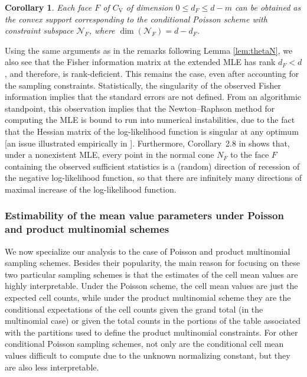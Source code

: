 \documentclass[aos,MSNbibl,nameyear,dvips]{arximspdf}
\newtheorem{corollary}[theorem]{Corollary}
\newcommand{\m}[1]{\mathrm{#1}}
\begin{document}
\begin{corollary}\label{cor:struct}
Each face $F$ of $C_{\m{V}}$ of dimension $0 \leq d_F \leq d - m$ can
be obtained as the convex support corresponding to the conditional
Poisson scheme with constraint subspace $\mathcal{N}_{F}$, where
$\operatorname{dim}(\mathcal{N}_{F}) = d - d_F$.
\end{corollary}

Using the same arguments as in the remarks following Lemma
\ref{lem:thetaN}, we also see that the Fisher information matrix at the
extended MLE has rank $d_F < d$, and therefore, is rank-deficient. This
remains the case, even after accounting for\vadjust{\goodbreak} the sampling constraints.
Statistically, the singularity of the observed Fisher information
implies that the standard errors are not defined. From an algorithmic
standpoint, this observation implies that the Newton--Raphson method
for computing the MLE is bound to run into numerical instabilities, due
to the fact that the Hessian matrix of the log-likelihood function is
singular at any optimum [an issue illustrated empirically in
\citet{ROY05}]. Furthermore, Corollary~2.8 in \citet{ERGM09} shows
that, under a nonexistent MLE, every point in the normal cone $N_F$ to
the face $F$ containing the observed sufficient statistics is a
(random) direction of recession of the negative log-likelihood
function, so that there are infinitely many directions of maximal
increase of the log-likelihood function.


\subsubsection{Estimability of the mean value parameters under Poisson
and product multinomial schemes}\label{sec:mean.value}

We now specialize our analysis to the case of Poisson and product
multinomial sampling schemes. Besides their popularity, the main reason
for focusing on these two particular sampling schemes is that the
estimates of the cell mean values are highly interpretable. Under the
Poisson scheme, the cell mean values are just the expected cell counts,
while under the product multinomial scheme they are the conditional
expectations of the cell counts given the grand total (in the
multinomial case) or given the total counts in the portions of the
table associated with the partitions used to define the product
multinomial constraints. For other conditional Poisson sampling
schemes, not only are the conditional cell mean values difficult to
compute due to the unknown normalizing constant, but they are also less
interpretable.
\end{document}
